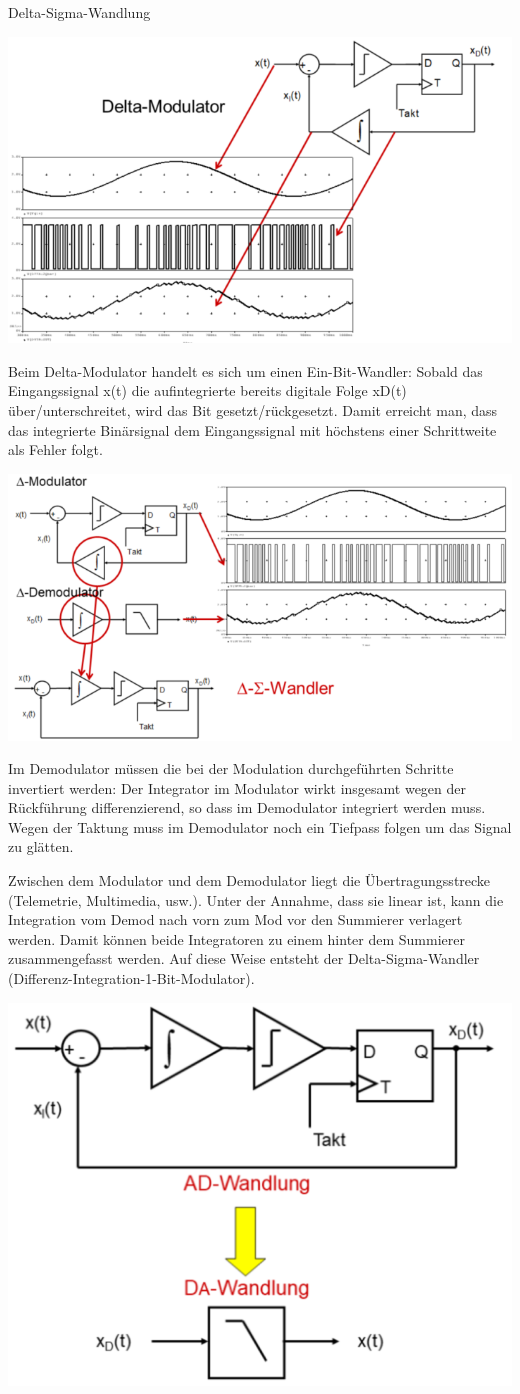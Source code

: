\documentclass[a4paper]{article}
\begin{document}
\begin{multicols}{3}
  Delta-Sigma-Wandlung

  \begin{itemize*}
    \item \includegraphics[width=.5\linewidth]{Assets/Biosignalverarbeitung-Delta-Sigma-Wandlung.png}
    \item Beim Delta-Modulator handelt es sich um einen Ein-Bit-Wandler: Sobald das Eingangssignal x(t) die aufintegrierte bereits digitale Folge xD(t) über/unterschreitet, wird das Bit gesetzt/rückgesetzt. Damit erreicht man, dass das integrierte Binärsignal dem Eingangssignal mit höchstens einer Schrittweite als Fehler folgt.
    \item \includegraphics[width=.5\linewidth]{Assets/Biosignalverarbeitung-Delta-Sigma-Wandlung-2.png}
    \item Im Demodulator müssen die bei der Modulation durchgeführten Schritte invertiert werden: Der Integrator im Modulator wirkt insgesamt wegen der Rückführung differenzierend, so dass im Demodulator integriert werden muss. Wegen der Taktung muss im Demodulator noch ein Tiefpass folgen um das Signal zu glätten.
    \item Zwischen dem Modulator und dem Demodulator liegt die Übertragungsstrecke (Telemetrie, Multimedia, usw.). Unter der Annahme, dass sie linear ist, kann die Integration vom Demod nach vorn zum Mod vor den Summierer verlagert werden. Damit können beide Integratoren zu einem hinter dem Summierer zusammengefasst werden. Auf diese Weise entsteht der Delta-Sigma-Wandler (Differenz-Integration-1-Bit-Modulator).
    \item \includegraphics[width=.5\linewidth]{Assets/Biosignalverarbeitung-Delta-Sigma-Wandlung-3.png}

\end{itemize*}
\end{multicols}
\end{document}
